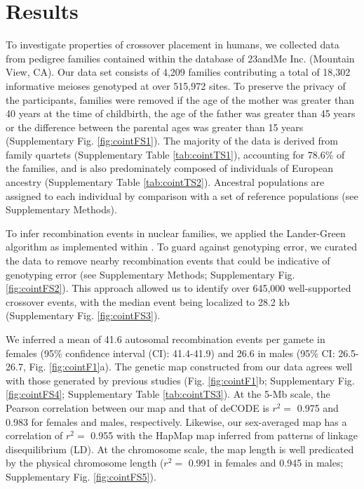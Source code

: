 \section{Results}

To investigate properties of crossover placement in humans, we
collected data from pedigree families contained within the
database of 23andMe Inc. (Mountain View, CA). Our data set
consists of 4,209 families contributing a total of 18,302
informative meioses genotyped at over 515,972 sites. To preserve
the privacy of the participants, families were removed if the age of
the mother was greater than 40 years at the time of childbirth,
the age of the father was greater than 45 years or the difference
between the parental ages was greater than 15 years
(Supplementary Fig. \ref{fig:cointFS1}). The majority of the data is derived from
family quartets (Supplementary Table \ref{tab:cointTS1}), accounting for 78.6\% of
the families, and is also predominately composed of individuals of
European ancestry (Supplementary Table \ref{tab:cointTS2}). Ancestral populations
are assigned to each individual by comparison with a set of
reference populations (see Supplementary Methods).

To infer recombination events in nuclear families, we applied
the Lander-Green algorithm as implemented within \citet{Abecasis2002}.
To guard against genotyping error, we curated the data to remove
nearby recombination events that could be indicative of
genotyping error (see Supplementary Methods; Supplementary
Fig. \ref{fig:cointFS2}). This approach allowed us to identify over 645,000 
well-supported crossover events, with the median event being localized
to 28.2 kb (Supplementary Fig. \ref{fig:cointFS3}).

We inferred a mean of 41.6 autosomal recombination events
per gamete in females (95\% confidence interval (CI): 41.4-41.9)
and 26.6 in males (95\% CI: 26.5-26.7, Fig. \ref{fig:cointF1}a). The genetic map
constructed from our data agrees well with those generated by
previous studies (Fig. \ref{fig:cointF1}b; Supplementary Fig. \ref{fig:cointFS4}; Supplementary
Table \ref{tab:cointTS3}). At the 5-Mb scale, the Pearson correlation between our
map and that of deCODE\cite{Kong2010} is $r^2=$ 0.975 and 0.983 for females and
males, respectively. Likewise, our sex-averaged map has a
correlation of $r^2=$ 0.955 with the HapMap map inferred from
patterns of linkage disequilibrium (LD)\cite{hapmap2007}. At the chromosome
scale, the map length is well predicated by the physical
chromosome length ($r^2=$ 0.991 in females and 0.945 in males;
Supplementary Fig. \ref{fig:cointFS5}).

